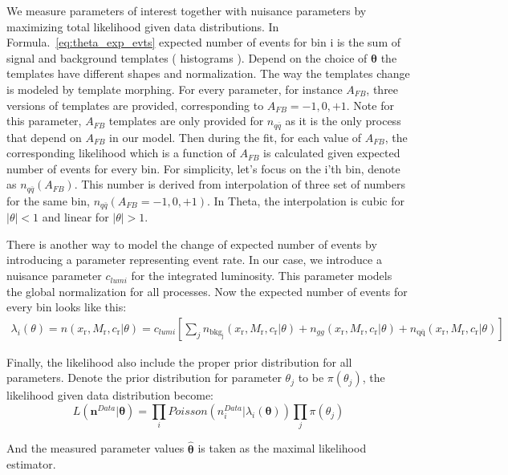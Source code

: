 We measure parameters of interest together with nuisance parameters by maximizing total likelihood given data distributions. In Formula.~\ref{eq:theta_exp_evts}  expected number of events for bin i is the sum of signal and background templates ( histograms ). Depend on the choice of $\bm\theta$ the templates have different shapes and normalization. The way the templates change is modeled by template morphing. For every parameter, for instance $A_{FB}$, three versions of templates are provided, corresponding to $A_{FB}= -1,0,+1$. Note for this parameter, $A_{FB}$ templates are only provided for $n_{q\bar{q}}$ as it is the only process that depend on $A_{FB}$ in our model. Then during the fit, for each value of $A_{FB}$, the corresponding likelihood which is a function of $A_{FB}$ is calculated given expected number of events for every bin. For simplicity, let's focus on the i'th bin, denote as $n_{q\bar{q}}(A_{FB})$. This number is derived from interpolation of three set of numbers for the same bin,  $n_{q\bar{q}}(A_{FB}=-1,0,+1)$. In Theta, the interpolation is cubic for $|\theta|<1$ and linear for $|\theta|>1$.

There is another way to model the change of expected number of events by introducing a parameter representing event rate. In our case, we introduce a nuisance parameter $c_{lumi}$ for the integrated luminosity. This parameter models the global normalization for all processes. Now the expected number of events for every bin looks like this:
\begin{align}
\lambda_i(\theta)= n(x_\mathrm{r},M_\mathrm{r},c_\mathrm{r}|\theta) =c_{lumi}\left[\sum_j n_\mathrm{bkg_j}(x_\mathrm{r},M_\mathrm{r},c_\mathrm{r}|\theta)+n_{gg}(x_\mathrm{r},M_\mathrm{r},c_\mathrm{r}|\theta) +n_\mathrm{q\bar{q}}(x_\mathrm{r}, M_\mathrm{r}, c_\mathrm{r}|\theta) \right]
\label{eq:theta_exp_evts}
\end{align}

Finally, the likelihood also include the proper prior distribution for all parameters. Denote the prior distribution for parameter $\theta_j$ to be $\pi(\theta_j)$, the likelihood given data distribution become:
\begin{equation}
L(\bm{n}^{Data}|\bm \theta )=\prod_i Poisson(n_i^{Data}|\lambda_i(\bm{\theta}))\prod_j \pi(\theta_j)
\label{eq:theta_likelihood}
\end{equation}

And the measured parameter values $\bm{\hat{\theta}}$ is taken as the maximal likelihood estimator.

